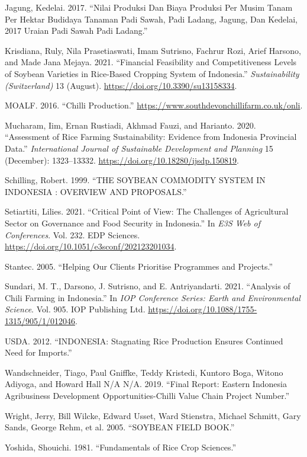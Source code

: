 \documentclass[
]{article}
\newlength{\cslhangindent}
\newlength{\cslentryspacingunit} %
\newenvironment{CSLReferences}[2] %
 {%
  \setlength{\parindent}{0pt}
  \ifodd #1
  \let\oldpar\par
  \def\par{\hangindent=\cslhangindent\oldpar}
  \fi
  \setlength{\parskip}{#2\cslentryspacingunit}
 }%
 {}
\begin{document}
\begin{CSLReferences}{1}{0}
\leavevmode{}%
Jagung, Kedelai. 2017. {``Nilai Produksi Dan Biaya Produksi Per Musim
Tanam Per Hektar Budidaya Tanaman Padi Sawah, Padi Ladang, Jagung, Dan
Kedelai, 2017 Uraian Padi Sawah Padi Ladang.''}

\leavevmode{}%
Krisdiana, Ruly, Nila Prasetiaswati, Imam Sutrisno, Fachrur Rozi, Arief
Harsono, and Made Jana Mejaya. 2021. {``Financial Feasibility and
Competitiveness Levels of Soybean Varieties in Rice-Based Cropping
System of Indonesia.''} \emph{Sustainability (Switzerland)} 13 (August).
\url{https://doi.org/10.3390/su13158334}.

\leavevmode{}%
MOALF. 2016. {``Chilli Production.''}
\url{https://www.southdevonchillifarm.co.uk/onli}.

\leavevmode{}%
Mucharam, Iim, Ernan Rustiadi, Akhmad Fauzi, and Harianto. 2020.
{``Assessment of Rice Farming Sustainability: Evidence from Indonesia
Provincial Data.''} \emph{International Journal of Sustainable
Development and Planning} 15 (December): 1323--13332.
\url{https://doi.org/10.18280/ijsdp.150819}.

\leavevmode{}%
Schilling, Robert. 1999. {``THE SOYBEAN COMMODITY SYSTEM IN INDONESIA :
OVERVIEW AND PROPOSALS.''}

\leavevmode{}%
Setiartiti, Lilies. 2021. {``Critical Point of View: The Challenges of
Agricultural Sector on Governance and Food Security in Indonesia.''} In
\emph{E3S Web of Conferences}. Vol. 232. EDP Sciences.
\url{https://doi.org/10.1051/e3sconf/202123201034}.

\leavevmode{}%
Stantec. 2005. {``Helping Our Clients Prioritise Programmes and
Projects.''}

\leavevmode{}%
Sundari, M. T., Darsono, J. Sutrisno, and E. Antriyandarti. 2021.
{``Analysis of Chili Farming in Indonesia.''} In \emph{IOP Conference
Series: Earth and Environmental Science}. Vol. 905. IOP Publishing Ltd.
\url{https://doi.org/10.1088/1755-1315/905/1/012046}.

\leavevmode{}%
USDA. 2012. {``INDONESIA: Stagnating Rice Production Ensures Continued
Need for Imports.''}

\leavevmode{}%
Wandschneider, Tiago, Paul Gniffke, Teddy Kristedi, Kuntoro Boga, Witono
Adiyoga, and Howard Hall N/A N/A. 2019. {``Final Report: Eastern
Indonesia Agribusiness Development Opportunities-Chilli Value Chain
Project Number.''}

\leavevmode{}%
Wright, Jerry, Bill Wilcke, Edward Usset, Ward Stienstra, Michael
Schmitt, Gary Sands, George Rehm, et al. 2005. {``SOYBEAN FIELD BOOK.''}

\leavevmode{}%
Yoshida, Shouichi. 1981. {``Fundamentals of Rice Crop Sciences.''}

\end{CSLReferences}
\end{document}
